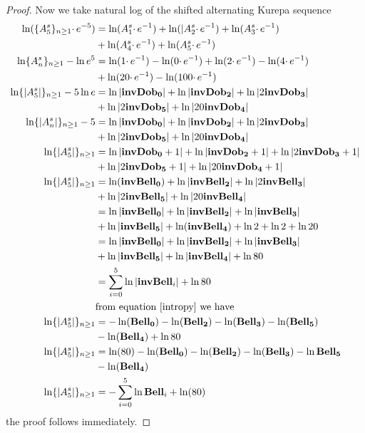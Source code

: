 \documentclass[pdflatex,sn-mathphys-num]{sn-jnl}%
\theoremstyle{thmstyleone}%
\theoremstyle{thmstyletwo}%
\theoremstyle{thmstylethree}%
\begin{document}
\begin{proof}
Now we take natural log of the shifted alternating Kurepa sequence
\begin{align*}
    \ln (\lbrace A_5^s\rbrace_{n\geq 1}\cdotp e^{-5})&= \ln(A_1^s\cdotp e^{-1}) + \ln(|A_2^s \cdotp e^{-1}) + \ln(A_3^s \cdotp e^{-1})\\
    &+ \ln(A_4^s \cdotp e^{-1})+ \ln(A_5^s \cdotp e^{-1})\\
\ln\lbrace A_n^s\rbrace_{n\geq 1}-\ln{e^{5}}&= \ln (1\cdotp e^{-1}) -  \ln (0\cdotp e^{-1}) + \ln(2\cdotp e^{-1}) - \ln(4\cdotp e^{-1})\\
&+ \ln(20\cdotp e^{-1}) - \ln(100\cdotp e^{-1})\\
\ln\lbrace |A_5^s|\rbrace_{n\geq 1}-5\ln{e} &=\ln |\mathbf{invDob_0}|+ \ln |\mathbf{invDob_2}|+ \ln |2\mathbf{invDob_3}|\\
&+\ln |2\mathbf{invDob_5}|+\ln |20\mathbf{invDob_4}|\\
\ln\lbrace |A_n^s|\rbrace_{n\geq 1}-5 &=\ln |\mathbf{invDob_0}|+ \ln |\mathbf{invDob_2}|+ \ln |2\mathbf{invDob_3}|\\
&+\ln |2\mathbf{invDob_5}|+\ln |20\mathbf{invDob_4}|\\
\ln\lbrace |A_5^s|\rbrace_{n\geq 1} &=\ln |\mathbf{invDob_0}+1|+ \ln |\mathbf{invDob_2}+1|+ \ln |2\mathbf{invDob_3}+1|\\
&+\ln |2\mathbf{invDob_5}+1|+\ln |20\mathbf{invDob_4}+1|\\
\ln\lbrace |A_5^s|\rbrace_{n\geq 1} &=\ln (\mathbf{invBell_0})+ \ln |\mathbf{invBell_2}|+\ln |2\mathbf{invBell_3}|\\
&+ \ln |2\mathbf{invBell_5}| + \ln |20\mathbf{invBell_4}|\\
&=\ln |\mathbf{invBell_0}|+ \ln |\mathbf{invBell_2}|+\ln |\mathbf{invBell_3}|\\
&+ \ln |\mathbf{invBell_5}| + \ln (\mathbf{invBell_4})+ \ln2+\ln2+\ln20\\
&=\ln |\mathbf{invBell_0}|+ \ln |\mathbf{invBell_2}|+\ln |\mathbf{invBell_3}|\\
&+ \ln |\mathbf{invBell_5}| + \ln |\mathbf{invBell_4}|+ \ln80\\
&=\sum_{i=0}^{5}\ln|\mathbf{invBell}_i| + \ln80\\
&\mbox{from equation \ref{intropy} we have }\\
\ln\lbrace |A_5^s|\rbrace_{n\geq 1}&=-\ln (\mathbf{Bell_0})- \ln (\mathbf{Bell_2})-\ln (\mathbf{Bell_3})
- \ln (\mathbf{Bell_5})\\ &- \ln (\mathbf{Bell_4})+ \ln80\\
\ln\lbrace |A_5^s|\rbrace_{n\geq 1}&=\ln(80)-\ln (\mathbf{Bell_0})- \ln (\mathbf{Bell_2})-\ln (\mathbf{Bell_3})
- \ln \mathbf{Bell_5}\\ &- \ln (\mathbf{Bell_4})\\
\ln\lbrace |A_5^s|\rbrace_{n\geq 1}&=-\sum_{i=0}^{5}\ln\mathbf{Bell}_i +\ln(80)
\end{align*}
the proof follows immediately.
\end{proof}
\end{document}
